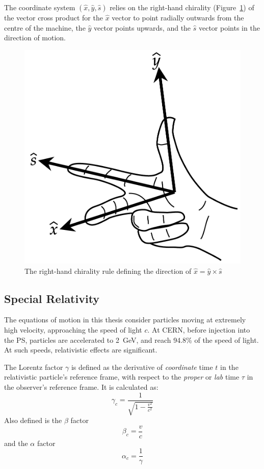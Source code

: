 \documentclass[11pt]{report}
\begin{document}
The coordinate system $(\hat x, \hat y, \hat s)$ relies on the right-hand chirality (Figure~\ref{fig:rhr}) of the vector cross product for the $\hat x$ vector to point radially outwards from the centre of the machine, the $\hat y$ vector points upwards, and the $\hat s$ vector points in the direction of motion.

\begin{figure}[!h]
\begin{center}
\includegraphics[scale=.25]{rhr.pdf}
\caption{The right-hand chirality rule defining the direction of $\hat x = \hat y \times \hat s$}\label{fig:rhr}
\end{center}
\end{figure}

\subsection{Special Relativity}

The equations of motion in this thesis consider particles moving at extremely high velocity, approaching the speed of light $c$. At CERN, before injection into the PS, particles are accelerated to \qty{2}{\giga\electronvolt}, and reach 94.8\% of the speed of light. At such speeds, relativistic effects are significant.

The Lorentz factor $\gamma$ is defined as the derivative of \textit{coordinate} time $t$ in the relativistic particle's reference frame, with respect to the \textit{proper} or \textit{lab} time $\tau$ in the observer's reference frame. It is calculated as:
\begin{equation}
    \gamma_c = \frac 1{\sqrt{1-\frac{v^2}{c^2}}}
\end{equation}
Also defined is the $\beta$ factor
\begin{equation}
    \beta_c = \frac vc
\end{equation}
and the $\alpha$ factor
\begin{equation}
    \alpha_c = \frac 1\gamma
\end{equation}
\end{document}
